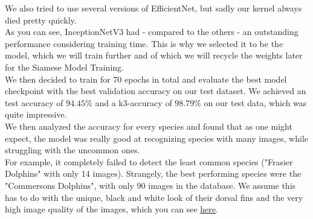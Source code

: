 \noindent We also tried to use several versions of EfficientNet, but sadly our kernel always died pretty quickly. \\

\noindent As you can see, InceptionNetV3 had - compared to the others - an outstanding performance considering training time. This is why we selected it to be the model, which we will train further and of which we will recycle the weights later for the Siamese Model Training. \\

\noindent We then decided to train for 70 epochs in total and evaluate the best model checkpoint with the best validation accuracy on our test dataset. We achieved an test accuracy of $94.45\%$ and a k3-accuracy of $98.79\%$ on our test data, which was quite impressive. \\
We then analyzed the accuracy for every species and found that as one might expect, the model was really good at recognizing species with many images, while struggling with the uncommon ones. \\
For example, it completely failed to detect the least common species ("Frasier Dolphins" with only 14 images). Strangely, the best performing species were the "Commersons Dolphins", with only 90 images in the database. We assume this has to do with the unique, black and white look of their dorsal fins and the very high image quality of the images, which you can see \href{https://drive.google.com/uc?id=1R8KGr8MjN4bOIDqaMQZQiSRsMcOiiZEd}{here}.

